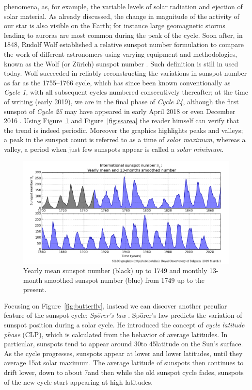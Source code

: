 phenomena, as, for example, the variable levels of solar radiation and ejection of solar material. As already discussed, the change in magnitude of the activity of our star is also visible on the Earth; for instance large geomagnetic storms leading to auroras are most common during the peak of the cycle. Soon after, in 1848, Rudolf Wolf established a relative sunspot number formulation to compare the work of different astronomers using varying equipment and methodologies, known as the Wolf (or Z\"{u}rich) sunspot number \cite{vaquero2007historical}. Such definition is still in used today. Wolf succeeded in reliably reconstructing the variations in sunspot number as far as the 1755--1766 cycle, which has since been known conventionally as \textit{Cycle 1}, with all subsequent cycles numbered consecutively thereafter; at the time of writing (early 2019), we are in the final phase of \textit{Cycle 24}, although the first sunspot of \textit{Cycle 25} may have appeared in early April 2018 \cite{cycle25-1}\cite{cycle25-2} or even December 2016 \cite{cycle25-3}. Using Figure~\ref{fig:SILSO2} and Figure~\ref{fig:ssarea} the reader himself can verify that the trend is indeed periodic. Moreover the graphics highlights peaks and valleys; a peak in the sunspot count is referred to as a time of \textit{solar maximum}, whereas a valley, a period when just few sunspots appear is called a \textit{solar minimum}.
\begin{figure}[t]
    \centering
    \includegraphics[width=\textwidth]{./pictures/SILSO2}
    \caption{Yearly mean sunspot number (black) up to 1749 and monthly 13-month smoothed sunspot number (blue) from 1749 up to the present.\cite{silso-graph}}
    \label{fig:SILSO2}
\end{figure}
Focusing on Figure~\ref{fig:butterfly}, instead we can discover another peculiar feature of the sunspot cycle: \textit{Sp\"{o}rer's law} \cite{ivanov2014sporer}. Sp\"{o}rer's law predicts the variation of sunspot position during a solar cycle. He introduced the concept of \textit{cycle latitude phase} (CLP), which is calculated from the behavior of average latitudes. In particular, sunspots tend to appear around 30\degree  to 45\degree  latitude on the Sun's surface. As the cycle progresses, sunspots appear at lower and lower latitudes, until they average 15\degree  at solar maximum. The average latitude of sunspots then continues to drift lower, down to about 7\degree  and then while the old sunspot cycle fades, sunspots of the new cycle start appearing at high latitudes.
